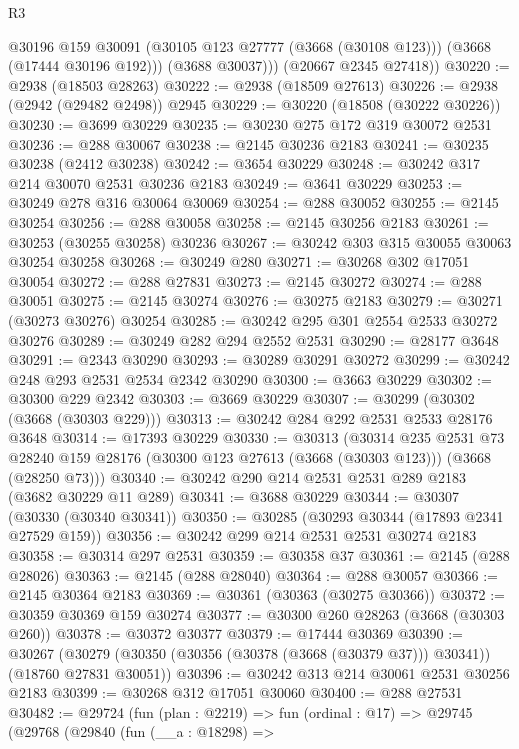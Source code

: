 \begin{lexlean}{R3}
\begin{coremodule}
            @30196
            @159
            @30091
            (@30105 @123 @27777 (@3668 (@30108 @123)))
            (@3668 (@17444 @30196 @192)))
          (@3688 @30037)))
      (@20667 @2345 @27418))
@30220 := @2938 (@18503 @28263)
@30222 := @2938 (@18509 @27613)
@30226 := @2938 (@2942 (@29482 @2498)) @2945
@30229 := @30220 (@18508 (@30222 @30226))
@30230 := @3699 @30229
@30235 := @30230 @275 @172 @319 @30072 @2531
@30236 := @288 @30067
@30238 := @2145 @30236 @2183
@30241 := @30235 @30238 (@2412 @30238)
@30242 := @3654 @30229
@30248 := @30242 @317 @214 @30070 @2531 @30236 @2183
@30249 := @3641 @30229
@30253 := @30249 @278 @316 @30064 @30069
@30254 := @288 @30052
@30255 := @2145 @30254
@30256 := @288 @30058
@30258 := @2145 @30256 @2183
@30261 := @30253 (@30255 @30258) @30236
@30267 := @30242 @303 @315 @30055 @30063 @30254 @30258
@30268 := @30249 @280
@30271 := @30268 @302 @17051 @30054
@30272 := @288 @27831
@30273 := @2145 @30272
@30274 := @288 @30051
@30275 := @2145 @30274
@30276 := @30275 @2183
@30279 := @30271 (@30273 @30276) @30254
@30285 := @30242 @295 @301 @2554 @2533 @30272 @30276
@30289 := @30249 @282 @294 @2552 @2531
@30290 := @28177 @3648
@30291 := @2343 @30290
@30293 := @30289 @30291 @30272
@30299 := @30242 @248 @293 @2531 @2534 @2342 @30290
@30300 := @3663 @30229
@30302 := @30300 @229 @2342
@30303 := @3669 @30229
@30307 := @30299 (@30302 (@3668 (@30303 @229)))
@30313 := @30242 @284 @292 @2531 @2533 @28176 @3648
@30314 := @17393 @30229
@30330 := @30313
    (@30314
      @235
      @2531
      @73
      @28240
      @159
      @28176
      (@30300 @123 @27613 (@3668 (@30303 @123)))
      (@3668 (@28250 @73)))
@30340 := @30242 @290 @214 @2531 @2531 @289 @2183 (@3682 @30229 @11 @289)
@30341 := @3688 @30229
@30344 := @30307 (@30330 (@30340 @30341))
@30350 := @30285 (@30293 @30344 (@17893 @2341 @27529 @159))
@30356 := @30242 @299 @214 @2531 @2531 @30274 @2183
@30358 := @30314 @297 @2531
@30359 := @30358 @37
@30361 := @2145 (@288 @28026)
@30363 := @2145 (@288 @28040)
@30364 := @288 @30057
@30366 := @2145 @30364 @2183
@30369 := @30361 (@30363 (@30275 @30366))
@30372 := @30359 @30369 @159 @30274
@30377 := @30300 @260 @28263 (@3668 (@30303 @260))
@30378 := @30372 @30377
@30379 := @17444 @30369
@30390 := @30267
    (@30279 (@30350 (@30356 (@30378 (@3668 (@30379 @37))) @30341)) (@18760 @27831 @30051))
@30396 := @30242 @313 @214 @30061 @2531 @30256 @2183
@30399 := @30268 @312 @17051 @30060
@30400 := @288 @27531
@30482 := @29724
    (fun (plan : @2219) =>
    fun (ordinal : @17) =>
    @29745
      (@29768
        (@29840
          (fun (__a : @18298) =>

\end{coremodule}
\end{lexlean}
